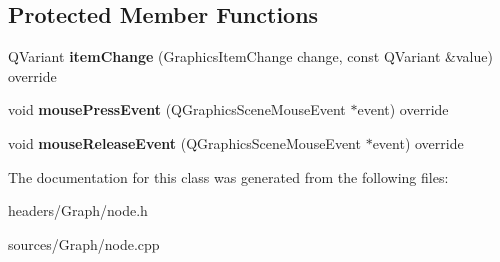 \subsection*{Protected Member Functions}
\begin{DoxyCompactItemize}
\item 
\mbox{\label{class_node_a18959a6037e96225835e07a32b4024ed}} 
Q\+Variant {\bfseries item\+Change} (Graphics\+Item\+Change change, const Q\+Variant \&value) override
\item 
\mbox{\label{class_node_a2412d8007e9fd9cd1e3bf7afee57906e}} 
void {\bfseries mouse\+Press\+Event} (Q\+Graphics\+Scene\+Mouse\+Event $\ast$event) override
\item 
\mbox{\label{class_node_afc1bc6e8ea97c95e6ced177e828f70e9}} 
void {\bfseries mouse\+Release\+Event} (Q\+Graphics\+Scene\+Mouse\+Event $\ast$event) override
\end{DoxyCompactItemize}


The documentation for this class was generated from the following files\+:\begin{DoxyCompactItemize}
\item 
headers/\+Graph/node.\+h\item 
sources/\+Graph/node.\+cpp\end{DoxyCompactItemize}
